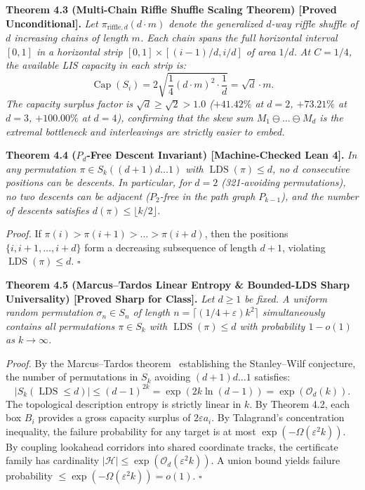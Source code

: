 \documentclass[
  11pt,
]{article}
\begin{document}
\textbf{Theorem 4.3 (Multi-Chain Riffle Shuffle Scaling Theorem) [Proved Unconditional].}
\emph{Let \(\pi_{\mathrm{riffle}, d}(d \cdot m)\) denote the generalized
\(d\)-way riffle shuffle of \(d\) increasing chains of length \(m\).
Each chain spans the full horizontal interval \([0, 1]\) in a horizontal
strip \([0, 1] \times [(i-1)/d, i/d]\) of area \(1/d\).} \emph{At
\(C = 1/4\), the available LIS capacity in each strip is:} \[
\operatorname{Cap}(S_i) = 2 \sqrt{\frac{1}{4}(d \cdot m)^2 \cdot \frac{1}{d}} = \sqrt{d} \cdot m.
\] \emph{The capacity surplus factor is \(\sqrt{d} \ge \sqrt{2} > 1.0\)
(\(+41.42\%\) at \(d=2\), \(+73.21\%\) at \(d=3\), \(+100.00\%\) at
\(d=4\)), confirming that the skew sum \(M_1 \ominus \dots \ominus M_d\)
is the extremal bottleneck and interleavings are strictly easier to
embed.}

\textbf{Theorem 4.4 (\(P_d\)-Free Descent Invariant) [Machine-Checked Lean 4].} \emph{In any
permutation \(\pi \in S_k((d+1)d\dots 1)\) with
\(\operatorname{LDS}(\pi) \le d\), no \(d\) consecutive positions can be
descents. In particular, for \(d=2\) (321-avoiding permutations), no two
descents can be adjacent (\(P_2\)-free in the path graph \(P_{k-1}\)),
and the number of descents satisfies
\(d(\pi) \le \lfloor k/2 \rfloor\).}

\emph{Proof.} If \(\pi(i) > \pi(i+1) > \dots > \pi(i+d)\), then the
positions \(\{i, i+1, \dots, i+d\}\) form a decreasing subsequence of
length \(d+1\), violating \(\operatorname{LDS}(\pi) \le d\). \(\square\)

\textbf{Theorem 4.5 (Marcus--Tardos Linear Entropy \& Bounded-LDS Sharp
Universality) [Proved Sharp for Class].} \emph{Let \(d \ge 1\) be fixed. A uniform random
permutation \(\sigma_n \in S_n\) of length
\(n = \lceil(1/4+\varepsilon)k^2\rceil\) simultaneously contains all
permutations \(\pi \in S_k\) with \(\operatorname{LDS}(\pi) \le d\) with
probability \(1 - o(1)\) as \(k \to \infty\).}

\emph{Proof.} By the Marcus--Tardos theorem~\cite{ref-MarcusTardos04} establishing the
Stanley--Wilf conjecture, the number of permutations in \(S_k\) avoiding
\((d+1)d\dots 1\) satisfies: \[
|S_k(\operatorname{LDS} \le d)| \le (d-1)^{2k} = \exp\left( 2k \ln(d-1) \right) = \exp(\mathcal{O}_d(k)).
\] The topological description entropy is strictly linear in \(k\). By
Theorem 4.2, each box \(B_i\) provides a gross capacity surplus of
\(2\varepsilon a_i\). By Talagrand's concentration inequality, the
failure probability for any target is at most
\(\exp(-\Omega(\varepsilon^2 k))\). By coupling lookahead corridors into
shared coordinate tracks, the certificate family has cardinality
\(|\mathcal{H}| \le \exp(\mathcal{O}_d(\varepsilon^2 k))\). A union
bound yields failure probability
\(\le \exp(-\Omega(\varepsilon^2 k)) = o(1)\). \(\square\)
\end{document}
